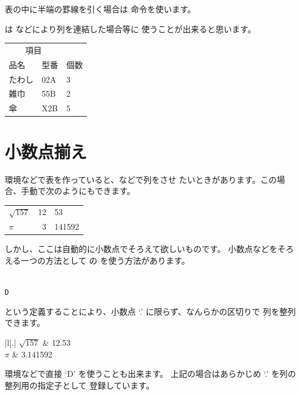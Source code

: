 表の中に半端の罫線を引く場合は  命令を使います。
\begin{Syntax}
\end{Syntax}
 は  などにより列を連結した場合等に
使うことが出来ると思います。
\begin{InOut}
\begin{tabular}{lll}
 \toprule
 \multicolumn{2}{c}{項目} & \\
 \cmidrule{1-2}
 品名 & 型番 & 個数\\
 \midrule
 たわし & 02A & 3 \\
 雑巾   & 55B & 2 \\
 傘     & X2B & 5 \\
 \bottomrule
\end{tabular}
\end{InOut}


\section{小数点揃え\texorpdfstring{\zdash}{---}}
 環境などで表を作っていると、などで列をさせ
たいときがあります。この場合、手動で次のようにもできます。
\begin{InOut}
 \begin{center}
  \begin{tabular}{|l|r@{.}l|}
   $\sqrt{157}$   & 12 & 53 \\
   $\pi$ & 3 & 141592 \\
  \end{tabular}
 \end{center}
\end{InOut}
しかし、ここは自動的に小数点でそろえて欲しいものです。
小数点などをそろえる一つの方法として  の 
を使う方法があります。
\begin{Syntax}
 \\
\texttt{D} 
\end{Syntax}
という定義することにより、小数点 `.' に限らず、なんらかの区切りで
列を整列できます。
\begin{InOut}
 \usepackage{dcolumn}
 \begin{center}
  \begin{tabular}{|l|.|}
   $\sqrt{157}$ & 12.53    \\
   $\pi$        & 3.141592 \\
  \end{tabular}
 \end{center}
\end{InOut}
 環境などで直接 `D' を使うことも出来ます。
上記の場合はあらかじめ `.' を列の整列用の指定子として
登録しています。

